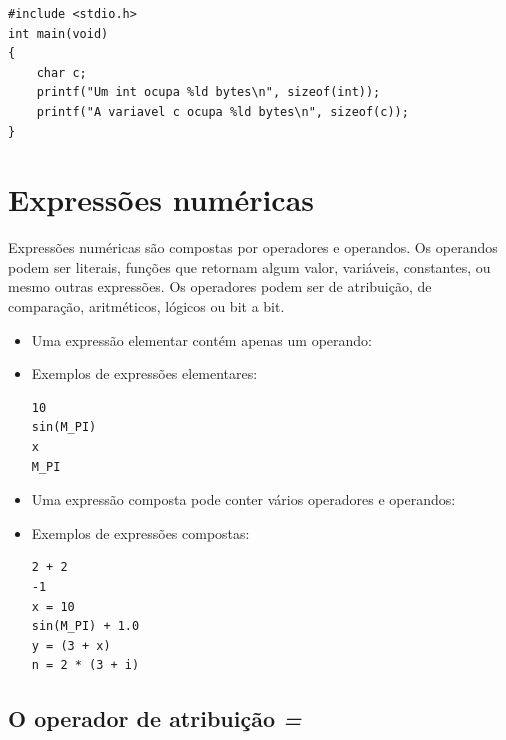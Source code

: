 \begin{lstlisting}
#include <stdio.h>
int main(void)
{
    char c;
    printf("Um int ocupa %ld bytes\n", sizeof(int));
    printf("A variavel c ocupa %ld bytes\n", sizeof(c));
}
\end{lstlisting}


\section{Expressões numéricas}
\label{sec:expr}

Expressões numéricas são compostas por operadores e operandos. Os operandos podem ser literais, funções que retornam algum valor, variáveis, constantes, ou mesmo outras expressões. Os operadores podem ser de atribuição, de comparação, aritméticos, lógicos ou bit a bit.

\begin{itemize}
\item Uma expressão elementar contém apenas um operando:

\item Exemplos de expressões elementares:
\begin{lstlisting}
10
sin(M_PI)
x
M_PI
\end{lstlisting}

\item Uma expressão composta pode conter vários operadores e operandos:

\item Exemplos de expressões compostas:
\begin{lstlisting}
2 + 2
-1
x = 10
sin(M_PI) + 1.0
y = (3 + x)
n = 2 * (3 + i)
\end{lstlisting}


\end{itemize}

\subsection{O operador de atribuição \emph{=}}

